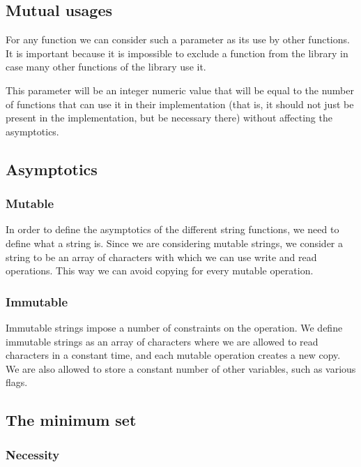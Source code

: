 \documentclass[anonymous,sigplan,review,11pt,nonacm,natbib=false]{acmart}
\begin{document}
    \subsection{Mutual usages}

    For any function we can consider such a parameter as its use by other functions. It is important because it is impossible to exclude a function from the library in case many other functions of the library use it.

    This parameter will be an integer numeric value that will be equal to the number of functions that can use it in their implementation (that is, it should not just be present in the implementation, but be necessary there) without affecting the asymptotics.

    \subsection{Asymptotics}

    \subsubsection{Mutable}

    In order to define the asymptotics of the different string functions, we need to define what a string is. Since we are considering mutable strings, we consider a string to be an array of characters with which we can use write and read operations. This way we can avoid copying for every mutable operation.

    \subsubsection{Immutable}

    Immutable strings impose a number of constraints on the operation. We define immutable strings as an array of characters where we are allowed to read characters in a constant time, and each mutable operation creates a new copy. We are also allowed to store a constant number of other variables, such as various flags.

    \subsection{The minimum set}

    \subsubsection{Necessity}
\end{document}
